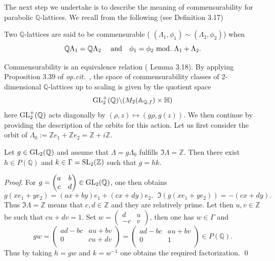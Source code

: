 \documentclass[graybox, envcountsect%
]{svmult}
\def\GL{{\rm GL}}
\def\SL{{\rm SL}}
\def\A{{\mathbb A}}
\def\Q{{\mathbb Q}}
\def\Z{{\mathbb Z}}
\def\H{{\mathbb H}}
\newcommand{\opcit}{{\it op.cit.\/}\ }
\def\mod{{\rm mod}}
\begin{document}
The next step we undertake is to describe the meaning of commensurability for parabolic $\Q$-lattices. We recall from \cite{cmbook} the following (see Definition 3.17)

\begin{definition}\label{defncommens}
	Two $\Q$-lattices are said to be commensurable ( 
$ (\Lambda_1, \phi_1) \sim (\Lambda_2, \phi_2)$)
when
\begin{equation}\label{commensrel}
\Q\Lambda_1=\Q\Lambda_2 \ \ \ \text{ and } \ \  \phi_1 = \phi_2 \ \mod. \
\Lambda_1 + \Lambda_2 .
\end{equation}
\end{definition}
Commensurability is an equivalence relation (\!\cite{cmbook} Lemma 3.18). By applying Proposition 3.39 of \opcit, the space of commensurability classes of 2-dimensional $\Q$-lattices
up to scaling is given by the quotient space
\begin{equation}\label{adelquot2dQlatt}
\GL_2^+(\Q)\backslash (M_2(\A_{\Q,f})\times \H)
\end{equation}
here $\GL_2^+(\Q)$ acts diagonally by $(\rho,z)\mapsto
(g\rho,g(z))$. We then continue by providing the description of the orbits for this action. Let us first consider the orbit of $\Lambda_0:=\Z e_1 + \Z e_2= \Z + i \Z$.

\begin{lemma}\label{lambdazero} Let $g\in \GL_2(\Q)$ and assume that $\Lambda=g\Lambda_0$ fulfills $\Im \Lambda=\Z$. Then there exist $h\in P(\Q)$ and $k\in \Gamma= \SL_2(\Z)$ such that $g=hk$.	
\end{lemma}
\begin{proof} For $g=\begin{pmatrix} a &b \\
c &d \end{pmatrix}\in \GL_2(\Q)$, one then obtains 
$$
g(x e_1 + y e_2) = (a x+ b y) e_1 + (cx+ dy) e_2, \ \ \Im(g(x e_1 + y e_2))=-(cx+ dy).
$$ 
Thus $\Im \Lambda=\Z$ means  that $c,d\in  \Z$ and they are relatively prime. Let then $u,v\in \Z$ be such that $cu+dv=1$. Set $w=\begin{pmatrix} d &u \\
-c &v \end{pmatrix}$, then one has $w\in \Gamma$ and
$$
gw=\left(
\begin{array}{cc}
 a d-b c & a u+b v \\
 0 & c u+d v \\
\end{array}
\right)=\left(
\begin{array}{cc}
 a d-b c & a u+b v \\
 0 & 1 \\
\end{array}
\right)\in P(\Q).
$$
Thus by taking $h=gw$ and $k=w^{-1}$ one obtains the required factorization. \qed\end{proof} 
\end{document}
